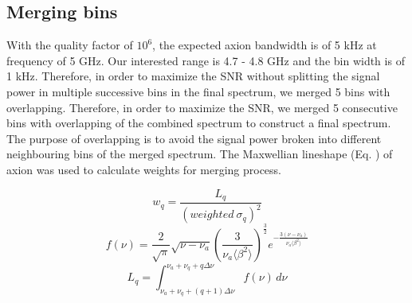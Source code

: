 
\subsection{Merging bins}

With the quality factor of $10^6$, the expected axion bandwidth is of 5 kHz at frequency of 5 GHz. Our interested range is 4.7 - 4.8 GHz and the bin width is of 1 kHz. Therefore, in order to maximize the SNR without splitting the signal power in multiple successive bins in the final spectrum, we merged 5 bins with overlapping.
Therefore, in order to maximize the SNR, we merged 5 consecutive bins with overlapping of the combined spectrum to construct a final spectrum. The purpose of overlapping is to avoid the signal power broken into different neighbouring bins of the merged spectrum.
The Maxwellian lineshape (Eq. \cite{}) of axion was used to calculate weights for merging process.


\begin{equation}
    \label{eq:merge_weight}
    w_{q} = \frac{L_{q}}{(weighted\ \sigma_{q})^{2}}
\end{equation}
\begin{equation}
    \label{eq:axion_line_shape}
    f(\nu) = \frac{2}{\sqrt{\pi}}\sqrt{\nu - \nu_a} \left( \frac{3}{\nu_a \big \langle \beta^{2} \big \rangle }\right)^{\frac{3}{2}} e^{- \frac{3(\nu-\nu_a)}{\nu_a \big \langle \beta^{2} \big \rangle}}
\end{equation}
\begin{equation}
    \label{eq:L_q_integtal}
    L_{q} = \int_{\nu_a +\nu_q + (q+1)\Delta\nu}^{\nu_a +\nu_q + q\Delta\nu} f(\nu) \,d\nu
\end{equation}

